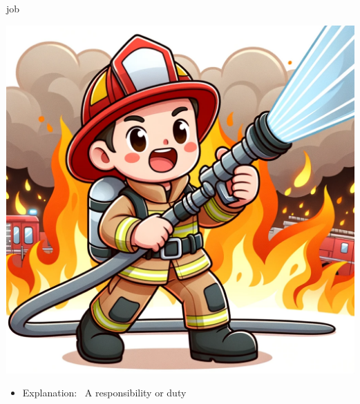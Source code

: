 \documentclass[avery5371, grid,frame]{flashcards}
\begin{document}
\renewcommand{\cardpaper}{a4paper}
\renewcommand{\cardpapermode}{landscape}
\renewcommand{\cardrows}{2}
\renewcommand{\cardcolumns}{2}
\setlength{\cardheight}{3.5in}
\setlength{\cardwidth}{5.0in}
\setlength{\topoffset}{0.65in}
\setlength{\oddoffset}{0.65in}
\setlength{\evenoffset}{0.65in}

\begin{flashcard}{job}
    \vspace*{\fill}
    \begin{center}
        \begin{minipage}[c]{.45\textwidth}
            \includegraphics[width=\textwidth]{cards/j/job/job - a firefighter in uniform bravely holding a hose, with flames in the background.png}
        \end{minipage}
        \begin{minipage}[c]{.45\textwidth}
            \begin{itemize}\setlength\itemsep{12pt}
            \item Explanation: \ A responsibility or duty


\end{itemize}
\end{minipage}
\end{center}
\end{flashcard}
\end{document}
